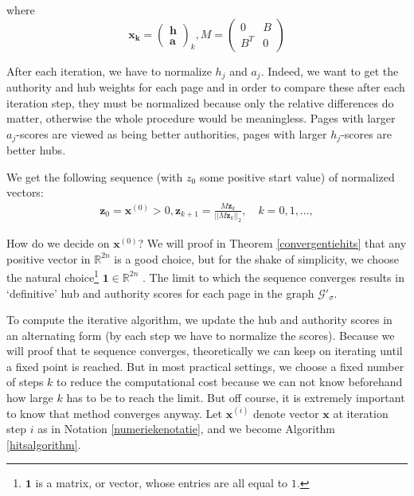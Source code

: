 \documentclass[a4paper,11pt]{report}
\newcommand{\R}{{\mathbb R}}
\newcommand{\graf}{\mathscr{G}}
\begin{document}
where 
$$\mathbf{x_k} = \begin{pmatrix} 
\mathbf{h}\\
\mathbf{a}
\end{pmatrix}_{k}, M =  \begin{pmatrix} 
0 & B\\
B^T & 0
\end{pmatrix}$$

After each iteration, we have to normalize $h_j$ and $a_j$. Indeed, we want to get the authority and hub weights for each page
and in order to compare these after each iteration step, they must be normalized because only the relative differences do matter, otherwise the whole procedure would be 
meaningless. Pages with larger $a_j$-scores are viewed as being better authorities, pages with larger $h_j$-scores are better hubs. 

We get the following sequence (with $z_0$ some positive start value) of normalized vectors: 
\begin{eqnarray}\label{sequencezk}
  \mathbf{z}_0 = \mathbf{x}^{(0)} > 0, \mathbf{z}_{k+1} = \frac{M\mathbf{z}_k}{||M\mathbf{z}_k||_2}, \quad k = 
  0,1,\ldots,
\end{eqnarray}

How do we decide on $\mathbf{x}^{(0)}$? We will proof in Theorem \ref{convergentiehits} that any positive vector in $\R^{2n}$ is a good choice, but for the shake of simplicity, we choose the natural choice\footnote{$\mathbf{1}$ is a matrix, or vector, whose entries are all equal to 
$1$.} $\mathbf{1} \in \R^{2n}$ . The limit to which the sequence converges 
results in `definitive' hub and authority scores for each page in the graph $\graf'_\sigma$. 

To compute the iterative algorithm, we update the hub and authority scores in an alternating form (by each step we have to normalize the scores). 
Because we will proof that te sequence converges, theoretically we can keep on iterating until a fixed point is reached. But in most practical settings, 
we choose a fixed number of steps $k$ to reduce the computational cost because we can not know beforehand how
large $k$ has to be to reach the limit. But off course, it is extremely important to know that method converges anyway. Let $\mathbf{x}^{(i)}$ denote vector $\mathbf{x}$ at iteration step $i$ as in Notation \ref{numeriekenotatie}, and we become Algorithm 
\ref{hitsalgorithm}.
\end{document}
